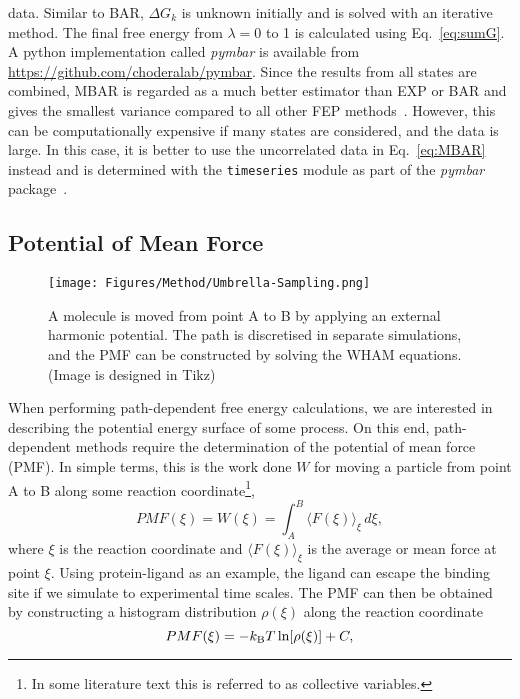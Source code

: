 data. Similar to BAR, $\Delta G_{k}$ is unknown initially and is solved with an iterative method. 
The final free energy from $\lambda=0$ to 1 is calculated using Eq.~\eqref{eq:sumG}. A python 
implementation called \textit{pymbar} is available from 
\url{https://github.com/choderalab/pymbar}. Since the results from all states are combined, MBAR 
is regarded as a much better estimator than EXP or BAR and gives the smallest variance compared 
to all other FEP methods~\cite{Shirts2008}. However, this can be computationally expensive if many 
states are considered, and the data is large. In this case, it is better to use the uncorrelated 
data in Eq.~\eqref{eq:MBAR} instead and is determined with the \verb+timeseries+ module as part 
of the \textit{pymbar} package~\cite{Chodera2016}.

\subsection{Potential of Mean Force}
\label{sec:PMF}
\begin{figure}[b!]
\centering
\texttt{[image: Figures/Method/Umbrella-Sampling.png]}
\caption{A molecule is moved from point A to B by applying an external harmonic 
potential. The path is discretised in separate simulations, and the PMF can be 
constructed by solving the WHAM equations. (Image is designed in Tikz)}
\label{method:US}
\end{figure}
When performing path-dependent free energy calculations, we are interested in describing the 
potential energy surface of some process. On this end, path-dependent methods require the 
determination of the potential of mean force (PMF). In simple terms, this is the work done 
$W$ for moving a particle from point A to B along some reaction coordinate\footnote{In some 
literature text this is referred to as collective variables.},
\begin{equation}
PMF(\xi) = W(\xi) = \int_{A}^{B} \langle F(\xi) \rangle_{\xi} \, d\xi,
\end{equation}
where $\xi$ is the reaction coordinate and $\langle F(\xi) \rangle_{\xi}$ is the average or 
mean force at point $\xi$. Using protein-ligand as an example, the ligand can escape the binding 
site if we simulate to experimental time scales. The PMF can then be obtained by 
constructing a histogram distribution $\rho(\xi)$ along the reaction coordinate
\begin{equation}
PMF(\xi) = -k_{\text{B}}T \, \text{ln}[\rho(\xi)] + C,
\end{equation}

